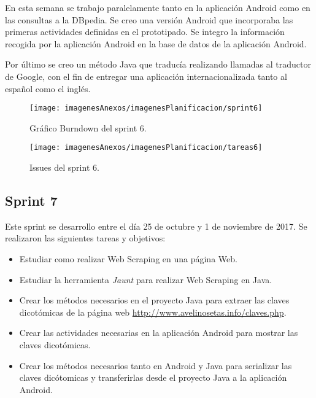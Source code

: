 En esta semana se trabajo paralelamente tanto en la aplicación Android como en las consultas a la DBpedia. Se creo una versión Android que incorporaba las primeras actividades definidas en el prototipado. Se integro la información recogida por la aplicación Android en la base de datos de la aplicación Android.

Por último se creo un método Java que traducía realizando llamadas al traductor de Google, con el fin de entregar una aplicación internacionalizada tanto al español como el inglés.

\begin{figure}[h]
    \begin{center}%
        \begin{center}%
          \texttt{[image: imagenesAnexos/imagenesPlanificacion/sprint6]}%
          \caption{Gráfico Burndown del sprint 6.}%
          \label{figSprint6}%
        \end{center}%
  	\end{center}%
\end{figure}%

\begin{figure}[h]
    \begin{center}%
        \begin{center}%
          \texttt{[image: imagenesAnexos/imagenesPlanificacion/tareas6]}%
          \caption{Issues del sprint 6.}%
          \label{figTareas6}%
        \end{center}%
  	\end{center}%
\end{figure}%
\newpage

\subsection{Sprint 7}

Este sprint se desarrollo entre el día 25 de octubre y 1 de noviembre de 2017. Se realizaron las siguientes tareas y objetivos:

\begin{itemize}
	\item Estudiar como realizar Web Scraping en una página Web.
	\item Estudiar la herramienta \textit{Jaunt} para realizar Web Scraping en Java.
	\item Crear los métodos necesarios en el proyecto Java para extraer las claves dicotómicas de la página web \url{http://www.avelinosetas.info/claves.php}.
	\item Crear las actividades necesarias en la aplicación Android para mostrar las claves dicotómicas.
	\item Crear los métodos necesarios tanto en Android y Java para serializar las claves dicótomicas y transferirlas desde el proyecto Java a la aplicación Android.
\end{itemize}

